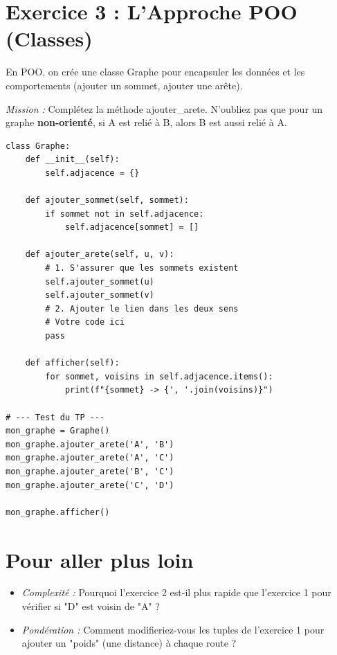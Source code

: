 \section*{ Exercice 3 : L'Approche POO (Classes)}

En POO, on crée une classe Graphe pour encapsuler les données et les comportements (ajouter un sommet, ajouter une arête).
\begin{Avous}
\textit{Mission :} Complétez la méthode ajouter\_arete. N'oubliez pas que pour un graphe \textbf{non-orienté}, si A est relié à B, alors B est aussi relié à A.
\end{Avous}

\begin{lstlisting}
class Graphe:
    def __init__(self):
        self.adjacence = {}

    def ajouter_sommet(self, sommet):
        if sommet not in self.adjacence:
            self.adjacence[sommet] = []

    def ajouter_arete(self, u, v):
        # 1. S'assurer que les sommets existent
        self.ajouter_sommet(u)
        self.ajouter_sommet(v)
        # 2. Ajouter le lien dans les deux sens
        # Votre code ici
        pass

    def afficher(self):
        for sommet, voisins in self.adjacence.items():
            print(f"{sommet} -> {', '.join(voisins)}")

# --- Test du TP ---
mon_graphe = Graphe()
mon_graphe.ajouter_arete('A', 'B')
mon_graphe.ajouter_arete('A', 'C')
mon_graphe.ajouter_arete('B', 'C')
mon_graphe.ajouter_arete('C', 'D')

mon_graphe.afficher()

\end{lstlisting}



\section*{ Pour aller plus loin}
\begin{itemize}
    \item \textit{Complexité :} Pourquoi l'exercice 2 est-il plus rapide que l'exercice 1 pour vérifier si "D" est voisin de "A" ?
    \item \textit{Pondération :} Comment modifieriez-vous les tuples de l'exercice 1 pour ajouter un "poids" (une distance) à chaque route ?
\end{itemize}
